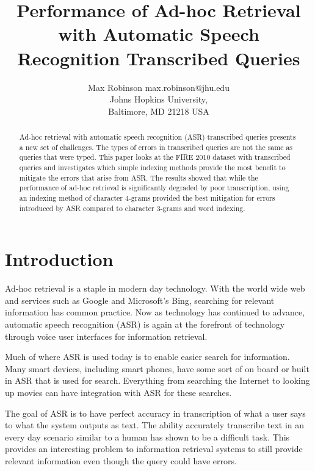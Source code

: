 \documentclass[jair, twoside,11pt,theapa]{article}
\begin{document}
\title{Performance of Ad-hoc Retrieval with Automatic Speech Recognition Transcribed Queries}

\author{\name Max Robinson \email max.robinson@jhu.edu \\
       \addr Johns Hopkins University,\\
       Baltimore, MD 21218 USA
}

\maketitle

\begin{abstract}
\label{Abstract}
Ad-hoc retrieval with automatic speech recognition (ASR) transcribed queries presents a new set of challenges. The types of errors in transcribed queries are not the same as queries that were typed. This paper looks at the FIRE 2010 dataset with transcribed queries and investigates which simple indexing methods provide the most benefit to mitigate the errors that arise from ASR. The results showed that while the performance of ad-hoc retrieval is significantly degraded by poor transcription, using an indexing method of character 4-grams provided the best mitigation for errors introduced by ASR compared to character 3-grams and word indexing. 

\end{abstract}


\section{Introduction}
\label{Introduction}
Ad-hoc retrieval is a staple in modern day technology. With the world wide web and services such as Google and Microsoft's Bing, searching for relevant information has common practice. Now as technology has continued to advance, automatic speech recognition (ASR) is again at the forefront of technology through voice user interfaces for information retrieval. 

Much of where ASR is used today is to enable easier search for information. Many smart devices, including smart phones, have some sort of on board or built in ASR that is used for search. Everything from searching the Internet to looking up movies can have integration with ASR for these searches.

The goal of ASR is to have perfect accuracy in transcription of what a user says to what the system outputs as text. The ability accurately transcribe text in an every day scenario similar to a human has shown to be a difficult task. This provides an interesting problem to information retrieval systems to still provide relevant information even though the query could have errors. 
\end{document}
